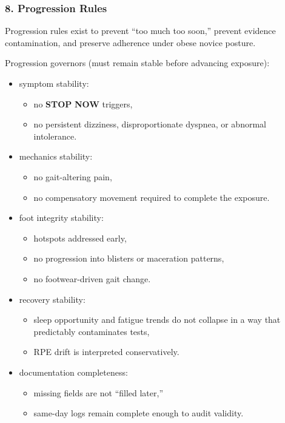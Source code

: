 \documentclass[10pt]{article}
\begin{document}
\begin{landscape}
\end{landscape}

\subsubsection*{8. Progression Rules}

Progression rules exist to prevent “too much too soon,” prevent evidence contamination, and preserve adherence under obese novice posture.

Progression governors (must remain stable before advancing exposure):

\begin{itemize}
\item symptom stability:
  \begin{itemize}
  \item no \textbf{STOP} \textbf{NOW} triggers,
  \item no persistent dizziness, disproportionate dyspnea, or abnormal intolerance.
  \end{itemize}

\item mechanics stability:
  \begin{itemize}
  \item no gait-altering pain,
  \item no compensatory movement required to complete the exposure.
  \end{itemize}

\item foot integrity stability:
  \begin{itemize}
  \item hotspots addressed early,
  \item no progression into blisters or maceration patterns,
  \item no footwear-driven gait change.
  \end{itemize}

\item recovery stability:
  \begin{itemize}
  \item sleep opportunity and fatigue trends do not collapse in a way that predictably contaminates tests,
  \item RPE drift is interpreted conservatively.
  \end{itemize}

\item documentation completeness:
  \begin{itemize}
  \item missing fields are not “filled later,”
  \item same-day logs remain complete enough to audit validity.
  \end{itemize}
\end{itemize}
\end{document}
